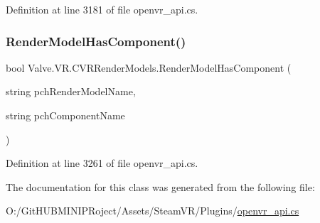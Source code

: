 Definition at line 3181 of file openvr\+\_\+api.\+cs.

\mbox{\label{class_valve_1_1_v_r_1_1_c_v_r_render_models_accd21964d7bf57ddddee33251dd38701}} 
\subsubsection{\texorpdfstring{RenderModelHasComponent()}{RenderModelHasComponent()}}
{\footnotesize\ttfamily bool Valve.\+V\+R.\+C\+V\+R\+Render\+Models.\+Render\+Model\+Has\+Component (\begin{DoxyParamCaption}\item[{string}]{pch\+Render\+Model\+Name,  }\item[{string}]{pch\+Component\+Name }\end{DoxyParamCaption})}



Definition at line 3261 of file openvr\+\_\+api.\+cs.



The documentation for this class was generated from the following file\+:\begin{DoxyCompactItemize}
\item 
O\+:/\+Git\+H\+U\+B\+M\+I\+N\+I\+P\+Roject/\+Assets/\+Steam\+V\+R/\+Plugins/\mbox{\hyperlink{openvr__api_8cs}{openvr\+\_\+api.\+cs}}\end{DoxyCompactItemize}

